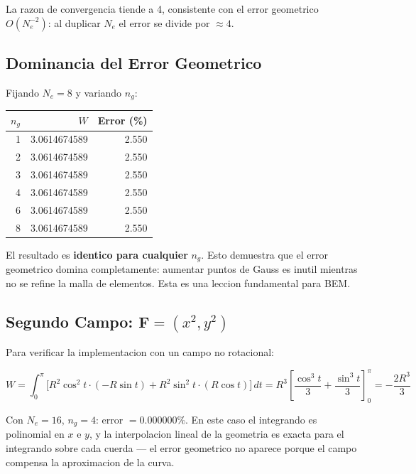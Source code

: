 \documentclass[12pt,a4paper]{article}
\begin{document}
La razon de convergencia tiende a 4, consistente con el error geometrico
$O(N_e^{-2})$: al duplicar $N_e$ el error se divide por $\approx 4$.

\subsection{Dominancia del Error Geometrico}

Fijando $N_e = 8$ y variando $n_g$:

\begin{center}
\begin{tabular}{rrr}
\toprule
$n_g$ & $W$ & Error (\%) \\
\midrule
1 & 3.0614674589 & 2.550 \\
2 & 3.0614674589 & 2.550 \\
3 & 3.0614674589 & 2.550 \\
4 & 3.0614674589 & 2.550 \\
6 & 3.0614674589 & 2.550 \\
8 & 3.0614674589 & 2.550 \\
\bottomrule
\end{tabular}
\end{center}

El resultado es \textbf{identico para cualquier} $n_g$. Esto demuestra
que el error geometrico domina completamente: aumentar puntos de Gauss
es inutil mientras no se refine la malla de elementos. Esta es una
leccion fundamental para BEM.

\subsection{Segundo Campo: $\mathbf{F} = (x^2, y^2)$}

Para verificar la implementacion con un campo no rotacional:

\begin{equation}
    W = \int_0^\pi \bigl[ R^2\cos^2 t \cdot (-R\sin t)
        + R^2\sin^2 t \cdot (R\cos t) \bigr]\, dt
    = R^3\left[\frac{\cos^3 t}{3} + \frac{\sin^3 t}{3}\right]_0^\pi
    = -\frac{2R^3}{3}
\end{equation}

Con $N_e = 16$, $n_g = 4$: error $= 0.000000\%$. En este caso el
integrando es polinomial en $x$ e $y$, y la interpolacion lineal de la
geometria es exacta para el integrando sobre cada cuerda ---
el error geometrico no aparece porque el campo compensa la aproximacion
de la curva.

\end{document}
